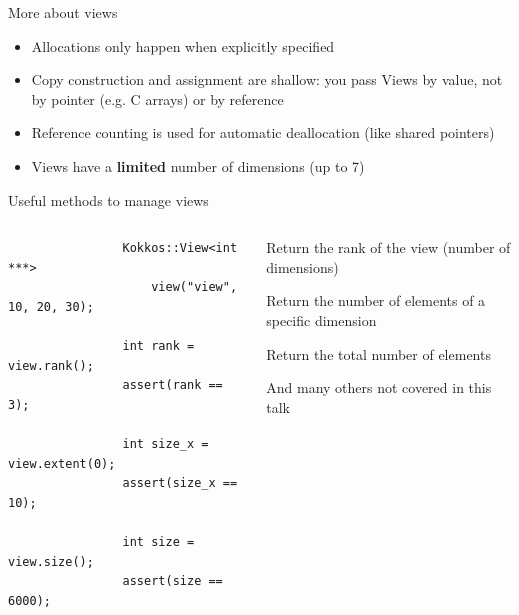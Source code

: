 \documentclass[aspectratio=169]{beamer}
\newcommand{\highlight}[1]{\textcolor{main}{\textbf{#1}}}
\begin{document}

\begin{frame}{More about views}
    \begin{itemize}
        \item Allocations only happen when explicitly specified
        \item Copy construction and assignment are shallow: you pass Views by value, not by pointer (e.g. C arrays) or by reference
        \item Reference counting is used for automatic deallocation (like shared pointers)
        \item Views have a \highlight{limited} number of dimensions (up to 7)
    \end{itemize}
\end{frame}


\begin{frame}[fragile]{Useful methods to manage views}
    \begin{columns}
        \begin{column}{0.45\linewidth}
            \begin{verbatim}
                Kokkos::View<int ***>
                    view("view", 10, 20, 30);

                int rank = view.rank();
                assert(rank == 3);

                int size_x = view.extent(0);
                assert(size_x == 10);

                int size = view.size();
                assert(size == 6000);
            \end{verbatim}
        \end{column}
        \begin{column}{0.55\linewidth}
            \begin{description}
                \item[\texttt{rank()}] Return the rank of the view (number of dimensions)
                \item[\texttt{extent(dim)}] Return the number of elements of a specific dimension
                \item[\texttt{size()}] Return the total number of elements
            \end{description}

            \vspace{0.5em}

            And many others not covered in this talk
        \end{column}
    \end{columns}
\end{frame}
\end{document}
